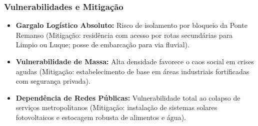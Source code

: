 \subsubsection{Vulnerabilidades e
Mitigação}

\begin{itemize}
\tightlist
\item
  \textbf{Gargalo Logístico Absoluto:} Risco de isolamento por bloqueio
  da Ponte Remanso (Mitigação: residência com acesso por rotas
  secundárias para Limpio ou Luque; posse de embarcação para via
  fluvial).
\item
  \textbf{Vulnerabilidade de Massa:} Alta densidade favorece o caos
  social em crises agudas (Mitigação: estabelecimento de base em áreas
  industriais fortificadas com segurança privada).
\item
  \textbf{Dependência de Redes Públicas:} Vulnerabilidade total ao
  colapso de serviços metropolitanos (Mitigação: instalação de sistemas
  solares fotovoltaicos e estocagem robusta de alimentos e água).
\end{itemize}

